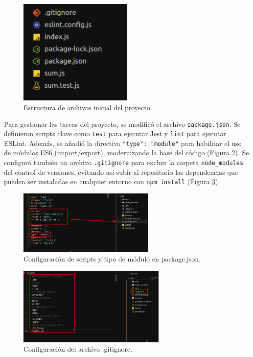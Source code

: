 \documentclass[12pt, a4paper]{article}
\begin{document}
\begin{figure}[H]
    \centering
    \includegraphics[width=0.5\textwidth]{img/todos los archivos creados.png}
    \caption{Estructura de archivos inicial del proyecto.}
    \label{fig:archivos_creados}
\end{figure}

Para gestionar las tareas del proyecto, se modific\'o el archivo \texttt{package.json}. Se definieron scripts clave como \texttt{test} para ejecutar Jest y \texttt{lint} para ejecutar ESLint. Adem\'as, se a\~nadi\'o la directiva \texttt{"type": "module"} para habilitar el uso de m\'odulos ES6 (import/export), modernizando la base del c\'odigo (Figura \ref{fig:package_json}). Se configur\'o tambi\'en un archivo \texttt{.gitignore} para excluir la carpeta \texttt{node\_modules} del control de versiones, evitando as\'i subir al repositorio las dependencias que pueden ser instaladas en cualquier entorno con \texttt{npm install} (Figura \ref{fig:gitignore}).

\begin{figure}[H]
    \centering
    \includegraphics[width=0.6\textwidth]{img/dentro de package json la configuracion de start lint test y type module.png}
    \caption{Configuraci\'on de scripts y tipo de m\'odulo en package.json.}
    \label{fig:package_json}
\end{figure}

\begin{figure}[H]
    \centering
    \includegraphics[width=0.65\textwidth]{img/configuracion gitignore.png}
    \caption{Configuraci\'on del archivo .gitignore.}
    \label{fig:gitignore}
\end{figure}
\end{document}
